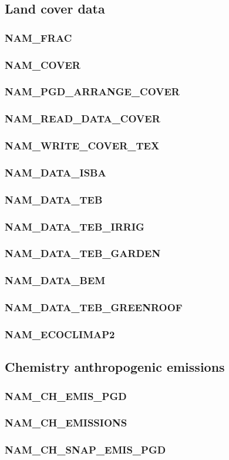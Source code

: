 \newpage
\subsection{Land cover data}
\subsubsection{NAM\_FRAC}
\subsubsection{NAM\_COVER}
\subsubsection{NAM\_PGD\_ARRANGE\_COVER}
\subsubsection{NAM\_READ\_DATA\_COVER}
\subsubsection{NAM\_WRITE\_COVER\_TEX}
\subsubsection{NAM\_DATA\_ISBA}
\subsubsection{NAM\_DATA\_TEB}
\subsubsection{NAM\_DATA\_TEB\_IRRIG}
\subsubsection{NAM\_DATA\_TEB\_GARDEN}
\subsubsection{NAM\_DATA\_BEM}
\subsubsection{NAM\_DATA\_TEB\_GREENROOF}
\subsubsection{NAM\_ECOCLIMAP2}

\newpage
\subsection{Chemistry anthropogenic emissions}
\subsubsection{NAM\_CH\_EMIS\_PGD}
\subsubsection{NAM\_CH\_EMISSIONS}
\subsubsection{NAM\_CH\_SNAP\_EMIS\_PGD}
